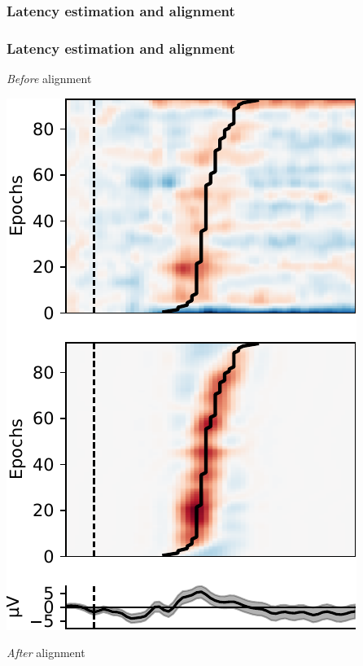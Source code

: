 \documentclass{kul-ulille-beamer}
\begin{document}
\begin{frame}
  \frametitle{Latency estimation and alignment}
  \frametitle{Latency estimation and alignment}
  \begin{minipage}{.3\textwidth}
    \emph{Before} alignment
    \smallskip

    \includegraphics[height=1.3\textwidth]{figures/covert/split_p3_latency_subject.pdf}
  \end{minipage}
  \begin{minipage}{.3\textwidth}
    \emph{After} alignment
    \smallskip


\end{minipage}
\end{frame}
\end{document}
